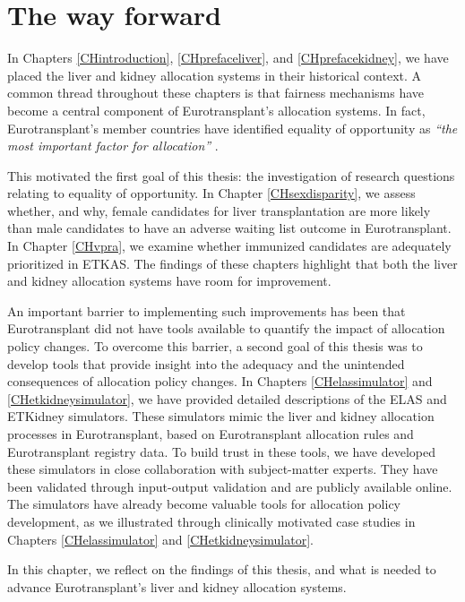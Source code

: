 \documentclass[11pt,twoside,]{book}
\begin{document}
\chapter{The way forward}\label{CHdiscussion}

In Chapters \ref{CHintroduction}, \ref{CHprefaceliver}, and \ref{CHprefacekidney},
we have placed the liver and kidney allocation systems in their historical context.
A common thread throughout these chapters is that fairness mechanisms
have become a central component of Eurotransplant's allocation
systems. In fact, Eurotransplant's member countries have identified
equality of opportunity as \emph{``the most important factor for allocation''} \citep{ETMan2025}.

This motivated the first goal of this thesis: the investigation of research
questions relating to equality of opportunity. In Chapter \ref{CHsexdisparity},
we assess
whether, and why, female candidates for liver transplantation are
more likely than male candidates to
have an adverse waiting list outcome in Eurotransplant. In Chapter \ref{CHvpra},
we examine whether immunized candidates are adequately prioritized in ETKAS.
The findings of these chapters highlight
that both the liver and kidney allocation systems have room for improvement.

An important barrier to implementing such improvements has been that Eurotransplant
did not have tools available to quantify the impact of allocation policy changes.
To overcome this barrier, a second goal of this thesis was to develop tools that
provide insight into the adequacy and the unintended consequences of allocation policy
changes. In Chapters \ref{CHelassimulator} and \ref{CHetkidneysimulator},
we have provided detailed
descriptions of the ELAS and ETKidney simulators. These simulators mimic the
liver and kidney allocation processes in Eurotransplant, based on Eurotransplant
allocation rules and Eurotransplant registry data. To build trust in these tools, we have developed these simulators
in close collaboration with subject-matter experts. They have been validated
through input-output validation and are publicly available online. The simulators
have already become valuable tools for allocation policy development,
as we illustrated through clinically motivated case studies in
Chapters \ref{CHelassimulator} and \ref{CHetkidneysimulator}.

In this chapter, we reflect on the findings of this thesis, and what is needed
to advance Eurotransplant's liver and kidney allocation systems.
\end{document}
